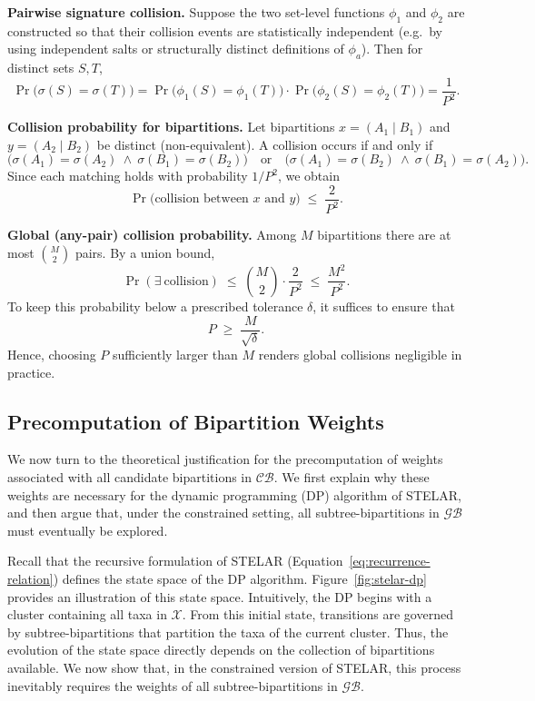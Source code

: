\documentclass[10pt,a4paper]{article}
\begin{document}
\textbf{Pairwise signature collision.}  
Suppose the two set-level functions $\phi_1$ and $\phi_2$ are constructed so that their collision events are statistically independent (e.g.\ by using independent salts or structurally distinct definitions of $\phi_a$). Then for distinct sets $S,T$,
\[
\Pr\big(\sigma(S)=\sigma(T)\big)
= \Pr\big(\phi_1(S)=\phi_1(T)\big)\cdot \Pr\big(\phi_2(S)=\phi_2(T)\big)
= \frac{1}{P^2}.
\]



\textbf{Collision probability for bipartitions.}  
Let bipartitions $x=(A_1 \mid B_1)$ and $y=(A_2 \mid B_2)$ be distinct (non-equivalent).  
A collision occurs if and only if
\[
\big(\sigma(A_1)=\sigma(A_2)\ \wedge\ \sigma(B_1)=\sigma(B_2)\big)
\quad\text{or}\quad
\big(\sigma(A_1)=\sigma(B_2)\ \wedge\ \sigma(B_1)=\sigma(A_2)\big).
\]
Since each matching holds with probability $1/P^2$, we obtain
\[
\Pr\!\big(\text{collision between }x\text{ and }y\big) \;\le\; \frac{2}{P^2}.
\]




\textbf{Global (any-pair) collision probability.}  
Among $M$ bipartitions there are at most $\binom{M}{2}$ pairs. By a union bound,
\[
\Pr(\exists\ \text{collision}) \;\le\; \binom{M}{2}\cdot \frac{2}{P^2}
\;\le\; \frac{M^2}{P^2}.
\]
To keep this probability below a prescribed tolerance $\delta$, it suffices to ensure that
\[
P \;\geq\; \frac{M}{\sqrt{\delta}}.
\]
Hence, choosing $P$ sufficiently larger than $M$ renders global collisions negligible in practice.






\subsection{Precomputation of Bipartition Weights}
\label{subsec:weight-precomp}

We now turn to the theoretical justification for the precomputation of weights associated with all candidate bipartitions in $\mathcal{CB}$. We first explain why these weights are necessary for the dynamic programming (DP) algorithm of STELAR, and then argue that, under the constrained setting, all subtree-bipartitions in $\mathcal{GB}$ must eventually be explored.

Recall that the recursive formulation of STELAR (Equation~\eqref{eq:recurrence-relation}) defines the state space of the DP algorithm. Figure~\ref{fig:stelar-dp} provides an illustration of this state space. Intuitively, the DP begins with a cluster containing all taxa in $\mathcal{X}$. From this initial state, transitions are governed by subtree-bipartitions that partition the taxa of the current cluster. Thus, the evolution of the state space directly depends on the collection of bipartitions available. We now show that, in the constrained version of STELAR, this process inevitably requires the weights of all subtree-bipartitions in $\mathcal{GB}$.
\end{document}
